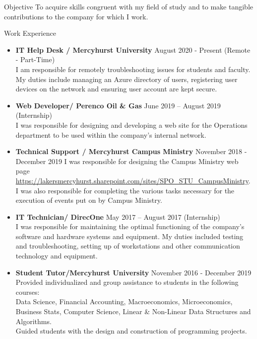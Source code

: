 \documentclass[11pt]{resume} %
\newcommand{\bold}[1]{\textbf{#1}}
\begin{document}
	
\begin{rSection}{Objective}
	To acquire skills congruent with my field of study and to make tangible contributions to the company for which I work.
\end{rSection}
\begin{rSection}{Work Experience}
\begin{itemize}
	
	\item\bold{IT Help Desk / Mercyhurst University} \quad August 2020 - Present (Remote - Part-Time)\\
	I am responsible for remotely troubleshooting issues for students and faculty. My duties include managing an Azure directory of users, registering user devices on the network and ensuring user account are kept secure.
	\\
	
	\item\bold{Web Developer/ Perenco Oil \& Gas} \quad June 2019 – August 2019 (Internship)\\
	I was responsible for designing and developing a web site for the Operations department to be used within the company's internal network.\\
	
	\item\bold{Technical Support / Mercyhurst Campus Ministry} \quad November 2018 - December 2019
	 I was responsible for designing the Campus Ministry web page  \url{https://lakersmercyhurst.sharepoint.com/sites/SPO_STU_CampusMinistry}.\\
	I was also responsible for completing the various tasks necessary for the execution of events put on by Campus Ministry.\\
	
	\item\bold{IT Technician/ DirecOne} \quad May 2017 – August 2017 (Internship)\\
	I was responsible for maintaining the optimal functioning of the company’s software and hardware systems and equipment. My duties included testing and troubleshooting, setting up of workstations and other communication technology and equipment.\\
	
	\item\bold{Student Tutor/Mercyhurst University} \quad November 2016 - December 2019\\
	Provided individualized and group assistance to students in the following courses:\\ Data Science, Financial Accounting, Macroeconomics, Microeconomics, Business Stats, Computer Science, Linear \& Non-Linear Data Structures and Algorithms.\\
	Guided students with the design and construction of programming projects.
	\\
	
\end{itemize}
\end{rSection}
\end{document}
